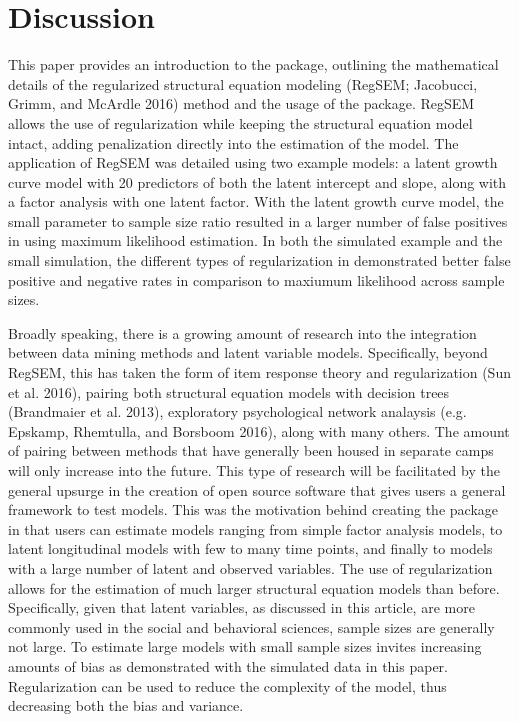\documentclass[article]{jss}
\begin{document}
\section{Discussion}\label{discussion}

This paper provides an introduction to the  package,
outlining the mathematical details of the regularized structural
equation modeling (RegSEM; Jacobucci, Grimm, and McArdle 2016) method
and the usage of the  package. RegSEM allows the use of
regularization while keeping the structural equation model intact,
adding penalization directly into the estimation of the model. The
application of RegSEM was detailed using two example models: a latent
growth curve model with 20 predictors of both the latent intercept and
slope, along with a factor analysis with one latent factor. With the
latent growth curve model, the small parameter to sample size ratio
resulted in a larger number of false positives in using maximum
likelihood estimation. In both the simulated example and the small
simulation, the different types of regularization in 
demonstrated better false positive and negative rates in comparison to
maxiumum likelihood across sample sizes.

Broadly speaking, there is a growing amount of research into the
integration between data mining methods and latent variable models.
Specifically, beyond RegSEM, this has taken the form of item response
theory and regularization (Sun et al. 2016), pairing both structural
equation models with decision trees (Brandmaier et al. 2013),
exploratory psychological network analaysis (e.g. Epskamp, Rhemtulla,
and Borsboom 2016), along with many others. The amount of pairing
between methods that have generally been housed in separate camps will
only increase into the future. This type of research will be facilitated
by the general upsurge in the creation of open source software that
gives users a general framework to test models. This was the motivation
behind creating the  package in that users can estimate
models ranging from simple factor analysis models, to latent
longitudinal models with few to many time points, and finally to models
with a large number of latent and observed variables. The use of
regularization allows for the estimation of much larger structural
equation models than before. Specifically, given that latent variables,
as discussed in this article, are more commonly used in the social and
behavioral sciences, sample sizes are generally not large. To estimate
large models with small sample sizes invites increasing amounts of bias
as demonstrated with the simulated data in this paper. Regularization
can be used to reduce the complexity of the model, thus decreasing both
the bias and variance.
\end{document}

